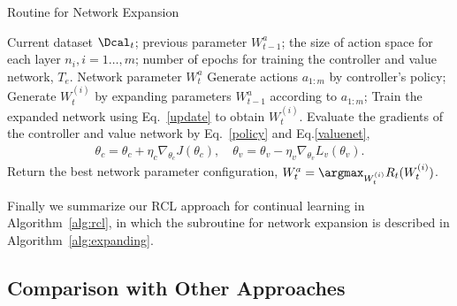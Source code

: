 \documentclass{article}
\begin{document}
\begin{algorithm}[tb]
  \caption{Routine for Network Expansion}
  \label{alg:expanding}
  \begin{algorithmic}[1]
     Current dataset $\Dcal_t$; previous parameter $W_{t-1}^a$; the size of action space for each layer $n_i, i=1\dots,m$; number of epochs for training the controller and value network, $T_e$.
     Network parameter $W_t^a$
    \STATE Generate actions $a_{1:m}$ by controller's policy;
    \STATE Generate $W_t^{(i)}$ by expanding parameters $W_{t-1}^a$ according to $a_{1:m}$; 
    \STATE Train the expanded network using Eq.~\eqref{update} to obtain $W_t^{(i)}$.
    \STATE Evaluate the gradients of the controller and value network by Eq.~\eqref{policy} and Eq.\eqref{valuenet},
    \begin{align}
    \theta_c = \theta_c + \eta_c \nabla_{\theta_c}J(\theta_c), \quad
    \theta_v = \theta_v - \eta_v \nabla_{\theta_v}L_v(\theta_v). \nonumber
    \end{align}
    \ENDFOR
    \STATE Return the best network parameter configuration, $W_t^a = \argmax_{W_t^{(i)}} R_t(W_t^{(i)})$.
  \end{algorithmic}
\end{algorithm}

Finally we summarize our RCL approach for continual learning in Algorithm~\ref{alg:rcl}, in which the subroutine for network expansion is described in Algorithm~\ref{alg:expanding}. 

\subsection{Comparison with Other Approaches}
\end{document}
